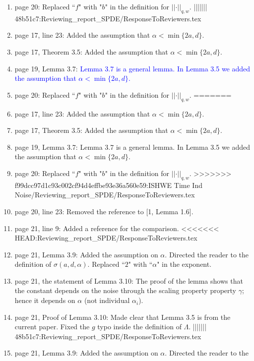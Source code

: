\documentclass[12pt]{article}%
\theoremstyle{plain}
\theoremstyle{definition}
\newcommand{\Norm}[1]{\left|\left|  #1   \right|\right|}
\numberwithin{equation}{section}
\begin{document}
\begin{enumerate}
  \item[34.] page 20: Replaced ``$f$" with "$b$" in the definition for
    $\Norm{\cdot}_{q,w}$.
||||||| 48b51c7:Reviewing_report_SPDE/ResponseToReviewers.tex
  \item[31.] page 17, line 23: Added the assumption that $\alpha < \min\{2a,d\}$.
  \item[32.] page 17, Theorem 3.5: Added the assumption that $\alpha < \min\{2a,d\}$.
  \item[33.] page 19, Lemma 3.7: \textcolor{blue}{Lemma 3.7 is a general lemma. In Lemma 3.5 we added the assumption that $\alpha < \min\{2a,d\}$.}
  \item[34.] page 20: Replaced ``$f$" with "$b$" in the definition for $\Norm{\cdot}_{q,w}$.
=======
  \item[31.] page 17, line 23: Added the assumption that $\alpha < \min\{2a,d\}$.
  \item[32.] page 17, Theorem 3.5: Added the assumption that $\alpha < \min\{2a,d\}$.
  \item[33.] page 19, Lemma 3.7: Lemma 3.7 is a general lemma. In Lemma 3.5 we added the assumption that $\alpha < \min\{2a,d\}$.
  \item[34.] page 20: Replaced ``$f$" with "$b$" in the definition for $\Norm{\cdot}_{q,w}$.
>>>>>>> f99dcc97d1c93c002cf94d4effbe93e36a560e59:ISHWE Time Ind Noise/Reviewing_report_SPDE/ResponseToReviewers.tex
  \item[35.] page 20, line 23: Removed the reference to [1, Lemma 1.6].
  \item[36.] page 21, line 9: Added a reference for the comparison.
<<<<<<< HEAD:Reviewing_report_SPDE/ResponseToReviewers.tex
  \item[37.] page 21, Lemma 3.9: Added the assumption on $\alpha$. Directed the
    reader to the definition of $\sigma(a,d,\alpha)$. Replaced ``$2$" with
    ``$\alpha$" in the exponent.
  \item[38.] page 21, the statement of Lemma 3.10: The proof of the lemma shows
    that the constant depends on the noise through the scaling property
    property $\gamma$; hence it depends on $\alpha$ (not individual
    $\alpha_i$).
  \item[39.] page 21, Proof of Lemma 3.10: Made clear that Lemma 3.5 is from
    the current paper. Fixed the $g$ typo inside the definition of $\Lambda$.
||||||| 48b51c7:Reviewing_report_SPDE/ResponseToReviewers.tex
  \item[37.] page 21, Lemma 3.9: Added the assumption on $\alpha$. Directed the reader to the

\end{enumerate}
\end{document}
